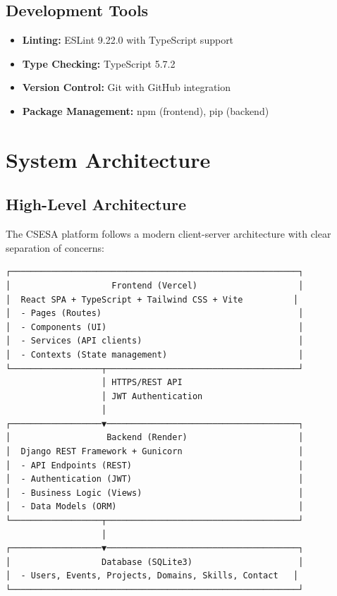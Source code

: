 \documentclass[11pt,a4paper]{article}
\begin{document}
\subsection{Development Tools}
\begin{itemize}[leftmargin=*]
    \item \textbf{Linting:} ESLint 9.22.0 with TypeScript support
    \item \textbf{Type Checking:} TypeScript 5.7.2
    \item \textbf{Version Control:} Git with GitHub integration
    \item \textbf{Package Management:} npm (frontend), pip (backend)
\end{itemize}

\section{System Architecture}

\subsection{High-Level Architecture}
The CSESA platform follows a modern client-server architecture with clear separation of concerns:

\begin{verbatim}
┌─────────────────────────────────────────────────────────┐
│                    Frontend (Vercel)                    │
│  React SPA + TypeScript + Tailwind CSS + Vite          │
│  - Pages (Routes)                                       │
│  - Components (UI)                                      │
│  - Services (API clients)                               │
│  - Contexts (State management)                          │
└──────────────────┬──────────────────────────────────────┘
                   │ HTTPS/REST API
                   │ JWT Authentication
                   │
┌──────────────────▼──────────────────────────────────────┐
│                   Backend (Render)                      │
│  Django REST Framework + Gunicorn                       │
│  - API Endpoints (REST)                                 │
│  - Authentication (JWT)                                 │
│  - Business Logic (Views)                               │
│  - Data Models (ORM)                                    │
└──────────────────┬──────────────────────────────────────┘
                   │
┌──────────────────▼──────────────────────────────────────┐
│                  Database (SQLite3)                     │
│  - Users, Events, Projects, Domains, Skills, Contact   │
└─────────────────────────────────────────────────────────┘
\end{verbatim}
\end{document}

